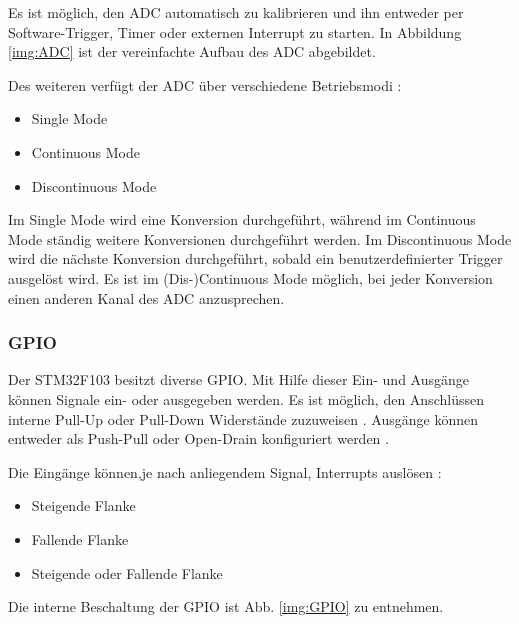 Es ist möglich, den \ac{ADC} automatisch zu kalibrieren und ihn entweder per Software-Trigger, Timer oder externen Interrupt zu starten. 
In Abbildung \ref{img:ADC} ist der vereinfachte Aufbau des \ac{ADC} abgebildet.

\smallskip 

Des weiteren verfügt der \ac{ADC} über verschiedene Betriebsmodi \citep{STM32_Ref}:
\begin{itemize}
    \item Single Mode 
    \item Continuous Mode
    \item Discontinuous Mode
\end{itemize}

Im Single Mode wird eine Konversion durchgeführt, während im Continuous Mode ständig weitere Konversionen durchgeführt werden. Im Discontinuous Mode
wird die nächste Konversion durchgeführt, sobald ein benutzerdefinierter Trigger ausgelöst wird. Es ist im (Dis-)Continuous Mode möglich, bei 
jeder Konversion einen anderen Kanal des \ac{ADC} anzusprechen.

\newpage

\subsubsection{GPIO}

Der STM32F103 besitzt diverse \acs{GPIO}. Mit Hilfe dieser Ein- und Ausgänge können Signale ein- oder ausgegeben werden. Es ist möglich,
den Anschlüssen interne Pull-Up oder Pull-Down Widerstände zuzuweisen \citep{STM32_Datasheet}. Ausgänge können entweder als Push-Pull oder Open-Drain
konfiguriert werden \citep{STM32_Ref}.

\smallskip

Die Eingänge können,je nach anliegendem Signal, Interrupts auslösen \citep{STM32_Ref}:
\begin{itemize}
    \item Steigende Flanke
    \item Fallende Flanke
    \item Steigende oder Fallende Flanke
\end{itemize}

Die interne Beschaltung der \ac{GPIO} ist Abb. \ref{img:GPIO} zu entnehmen.

\vspace{0.5cm}

